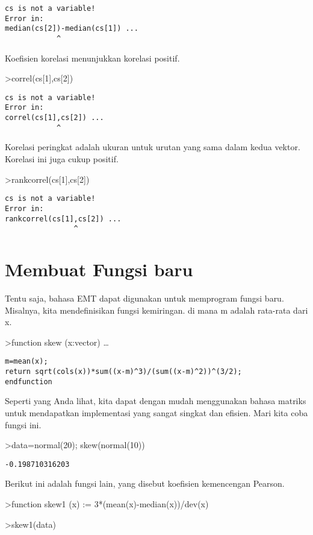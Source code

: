 \documentclass[
]{book}
\begin{document}
\begin{verbatim}
cs is not a variable!
Error in:
median(cs[2])-median(cs[1]) ...
            ^
\end{verbatim}

Koefisien korelasi menunjukkan korelasi positif.

\textgreater correl(cs{[}1{]},cs{[}2{]})

\begin{verbatim}
cs is not a variable!
Error in:
correl(cs[1],cs[2]) ...
            ^
\end{verbatim}

Korelasi peringkat adalah ukuran untuk urutan yang sama dalam kedua vektor. Korelasi ini juga cukup positif.

\textgreater rankcorrel(cs{[}1{]},cs{[}2{]})

\begin{verbatim}
cs is not a variable!
Error in:
rankcorrel(cs[1],cs[2]) ...
                ^
\end{verbatim}

\section{Membuat Fungsi baru}\label{membuat-fungsi-baru}

Tentu saja, bahasa EMT dapat digunakan untuk memprogram fungsi baru. Misalnya, kita mendefinisikan fungsi kemiringan. di mana m adalah rata-rata dari x.

\textgreater function skew (x:vector) \ldots{}

\begin{verbatim}
m=mean(x);
return sqrt(cols(x))*sum((x-m)^3)/(sum((x-m)^2))^(3/2);
endfunction
\end{verbatim}

Seperti yang Anda lihat, kita dapat dengan mudah menggunakan bahasa matriks untuk mendapatkan implementasi yang sangat singkat dan efisien. Mari kita coba fungsi ini.

\textgreater data=normal(20); skew(normal(10))

\begin{verbatim}
-0.198710316203
\end{verbatim}

Berikut ini adalah fungsi lain, yang disebut koefisien kemencengan Pearson.

\textgreater function skew1 (x) := 3*(mean(x)-median(x))/dev(x)

\textgreater skew1(data)
\end{document}
